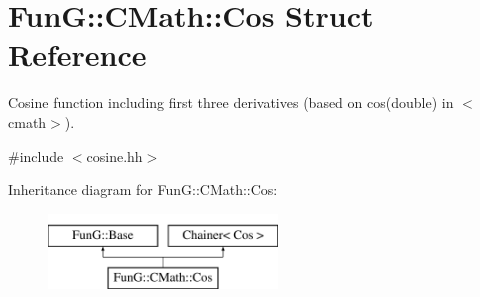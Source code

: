 \hypertarget{structFunG_1_1CMath_1_1Cos}{\section{Fun\-G\-:\-:C\-Math\-:\-:Cos Struct Reference}
\label{structFunG_1_1CMath_1_1Cos}
}


Cosine function including first three derivatives (based on cos(double) in $<$cmath$>$).  




{\ttfamily \#include $<$cosine.\-hh$>$}

Inheritance diagram for Fun\-G\-:\-:C\-Math\-:\-:Cos\-:\begin{figure}[H]
\begin{center}
\leavevmode
\includegraphics[height=2.000000cm]{structFunG_1_1CMath_1_1Cos}
\end{center}
\end{figure}
